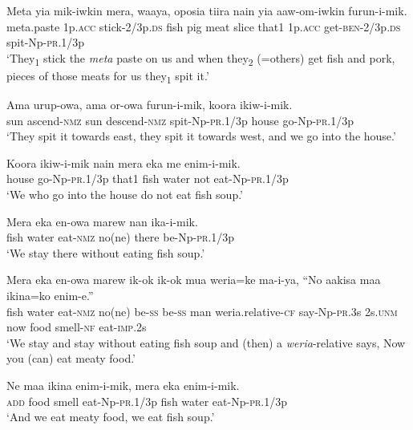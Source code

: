\ea\label{ex:a:x14}
\gll  Meta  yia  mik-iwkin  mera,  waaya,  oposia  tiira  nain    yia  aaw-om-iwkin  furun-i-mik. \\
meta.paste  1p.\textsc{acc}  stick-2/3p.\textsc{ds}  fish  pig  meat  slice  that1  1p.\textsc{acc}  get-\textsc{ben}-2/3p.\textsc{ds}  spit-Np-\textsc{pr}.1/3p \\


\glt ‘They\textsubscript{1} stick the \textit{meta} paste on us and when they\textsubscript{2} (=others) get fish and pork, pieces of those meats for us they\textsubscript{1} spit it.’ \\
\z


\ea\label{ex:a:x15}
\gll  Ama  urup-owa,  ama  or-owa  furun-i-mik,  koora  ikiw-i-mik. \\
sun  ascend-\textsc{nmz}  sun  descend-\textsc{nmz}  spit-Np-\textsc{pr}.1/3p  house  go-Np-\textsc{pr}.1/3p \\
\glt ‘They spit it towards east, they spit it towards west, and we go into the house.’ \\
\z


\ea\label{ex:a:x16}
\gll  Koora  ikiw-i-mik  nain  mera  eka  me  enim-i-mik. \\
house  go-Np-\textsc{pr}.1/3p  that1  fish  water  not  eat-Np-\textsc{pr}.1/3p \\
\glt ‘We who go into the house do not eat fish soup.’ \\
\z


\ea\label{ex:a:x17}
\gll  Mera  eka  en-owa  marew  nan  ika-i-mik. \\
fish  water  eat-\textsc{nmz}  no(ne)  there  be-Np-\textsc{pr}.1/3p \\
\glt ‘We stay there without eating fish soup.’ \\
\z


\ea\label{ex:a:x18}
\gll  Mera  eka  en-owa  marew  ik-ok  ik-ok  mua  weria=ke  ma-i-ya,            “No  aakisa  maa  ikina=ko  enim-e.” \\
fish  water  eat-\textsc{nmz}  no(ne)  be-\textsc{ss}  be-\textsc{ss}  man  weria.relative-\textsc{cf}  say-Np-\textsc{pr}.3s 2s.\textsc{unm}  now  food  smell-\textsc{nf}  eat-\textsc{imp}.2s \\


\glt ‘We stay and stay without eating fish soup and (then) a \textit{weria}{}-relative says, Now you (can) eat meaty food.’ \\
\z


\ea\label{ex:a:x19}
\gll  Ne  maa  ikina  enim-i-mik,  mera  eka  enim-i-mik. \\
\textsc{add}  food  smell  eat-Np-\textsc{pr}.1/3p  fish  water  eat-Np-\textsc{pr}.1/3p \\
\glt ‘And we eat meaty food, we eat fish soup.’ \\
\z


